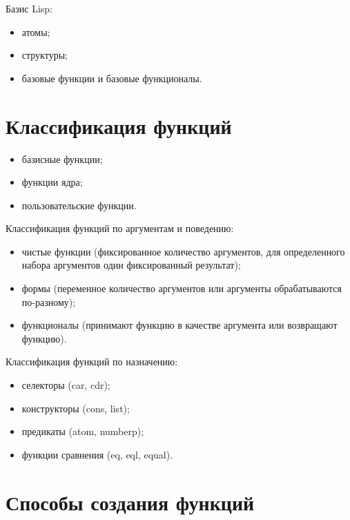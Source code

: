 \documentclass[12pt]{report}
\begin{document}
Базис Lisp:

\begin{itemize}
	\item атомы;
        \item структуры;
	\item базовые функции и базовые функционалы.
\end{itemize}


\section{Классификация функций}

\begin{itemize}
	\item базисные функции;
        \item функции ядра;
	\item пользовательские функции.
\end{itemize} 

Классификация функций по аргументам и поведению:

\begin{itemize}
	\item чистые функции (фиксированное количество аргументов, для определенного набора аргументов один фиксированный результат);
        \item формы (переменное количество аргументов или аргументы обрабатываются по-разному);
	\item функционалы (принимают функцию в качестве аргумента или возвращают функцию).
\end{itemize} 

Классификация функций по назначению:

\begin{itemize}
	\item селекторы (car, cdr);
        \item конструкторы (cons, list);
	\item предикаты (atom, numberp);
        \item функции сравнения (eq, eql, equal).
\end{itemize} 


\section{Способы создания функций}
\end{document}
